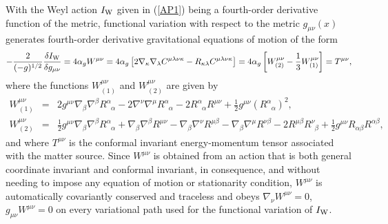 \documentclass[aps]{revtex4}
\begin{document}
With the Weyl action $I_{\rm W}$ given in  (\ref{AP1}) being a fourth-order derivative function of the metric, functional variation with respect to the metric $g_{\mu\nu}(x)$ generates fourth-order derivative gravitational equations of motion of the form \cite{Mannheim2006} 
%
\begin{eqnarray}
-\frac{2}{(-g)^{1/2}}\frac{\delta I_{\rm W}}{\delta g_{\mu\nu}}=4\alpha_g W^{\mu\nu}=4\alpha_g\left[2\nabla_{\kappa}\nabla_{\lambda}C^{\mu\lambda\nu\kappa}-
R_{\kappa\lambda}C^{\mu\lambda\nu\kappa}\right]=4\alpha_g\left[W^{\mu
\nu}_{(2)}-\frac{1}{3}W^{\mu\nu}_{(1)}\right]=T^{\mu\nu},
\label{AP3}
\end{eqnarray}
% 
where the functions $W^{\mu \nu}_{(1)}$ and $W^{\mu \nu}_{(2)}$ are given by
%                                                                               
\begin{eqnarray}
W^{\mu \nu}_{(1)}&=&
2g^{\mu\nu}\nabla_{\beta}\nabla^{\beta}R^{\alpha}_{\phantom{\alpha}\alpha}                                             
-2\nabla^{\nu}\nabla^{\mu}R^{\alpha}_{\phantom{\alpha}\alpha}                          
-2 R^{\alpha}_{\phantom{\alpha}\alpha}R^{\mu\nu}                              
+\frac{1}{2}g^{\mu\nu}(R^{\alpha}_{\phantom{\alpha}\alpha})^2,
\nonumber\\
W^{\mu \nu}_{(2)}&=&
\frac{1}{2}g^{\mu\nu}\nabla_{\beta}\nabla^{\beta}R^{\alpha}_{\phantom{\alpha}\alpha}
+\nabla_{\beta}\nabla^{\beta}R^{\mu\nu}                    
 -\nabla_{\beta}\nabla^{\nu}R^{\mu\beta}                       
-\nabla_{\beta}\nabla^{\mu}R^{\nu \beta}                          
 - 2R^{\mu\beta}R^{\nu}_{\phantom{\nu}\beta}                                    
+\frac{1}{2}g^{\mu\nu}R_{\alpha\beta}R^{\alpha\beta},
\label{AP4}
\end{eqnarray}                                 
%
and where $T^{\mu\nu}$ is the conformal invariant energy-momentum tensor associated with the matter source. Since $W^{\mu\nu}$ is obtained from an action that is both general coordinate invariant and conformal invariant, in consequence, and without needing to impose any equation of motion or stationarity condition, $W^{\mu\nu}$ is automatically covariantly conserved and traceless and obeys $\nabla_{\nu}W^{\mu\nu}=0$, $g_{\mu\nu}W^{\mu\nu}=0$ on every variational path used for the functional variation of $I_{\rm W}$.
   
\end{document}
